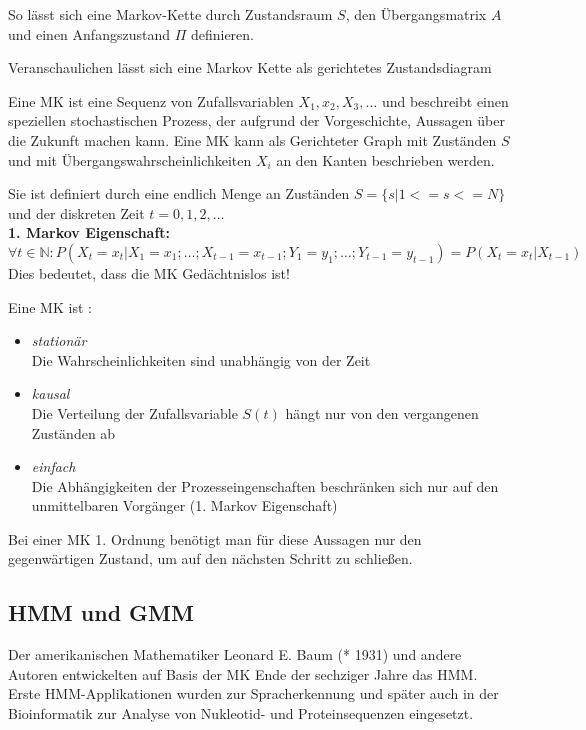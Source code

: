 So lässt sich eine Markov-Kette durch Zustandsraum \(S\), den Übergangsmatrix \( A \) und einen Anfangszustand \( \Pi \) definieren.
 
Veranschaulichen lässt sich eine Markov Kette als gerichtetes Zustandsdiagram




Eine \acl{MK} ist eine Sequenz von Zufallsvariablen \( X_1, x_2, X_3, \ldots\) und beschreibt einen speziellen stochastischen Prozess, 
der aufgrund der Vorgeschichte, Aussagen über die Zukunft machen kann. 
Eine \acl{MK} kann als Gerichteter Graph mit Zuständen \(S\) und mit Übergangswahrscheinlichkeiten \(X_i\) an den Kanten beschrieben werden. 

Sie ist definiert durch eine endlich Menge an Zuständen \( S = \{ s | 1 <= s <= N \} \) und der diskreten Zeit \( t = 0, 1, 2, \ldots \) \\

\textbf{1. Markov Eigenschaft: } \\
\( \forall t \in \mathbb{N} : P (X_t = x_t | X_1 = x_1 ; \ldots ; X_{t-1} = x_{t-1} ; Y_1 = y_1 ; \ldots ; Y_{t-1} = y_{t-1} ) = P (X_t = x_t | X_{t-1} ) \) \\
Dies bedeutet, dass die \acl{MK} Gedächtnislos ist!


Eine \acl{MK} ist \cite[48]{mmmFink}:
\begin{itemize}
     \item \textit{stationär} \\
           Die Wahrscheinlichkeiten sind unabhängig von der Zeit
     \item \textit{kausal} \\
           Die Verteilung der Zufallsvariable \( S(t)\) hängt nur von den vergangenen Zuständen ab
     \item \textit{einfach} \\
           Die Abhängigkeiten der Prozesseingenschaften beschränken sich nur auf den unmittelbaren Vorgänger (1. Markov Eigenschaft) 
\end{itemize}
Bei einer \acl{MK} 1. Ordnung benötigt man für diese Aussagen nur den gegenwärtigen Zustand, um auf den nächsten Schritt zu schließen.



\subsection{\acl{HMM} und \acl{GMM}}  \label{sec:hmm}
Der amerikanischen Mathematiker Leonard E. Baum (* 1931) und andere Autoren entwickelten auf Basis der \acl{MK} Ende der 
sechziger Jahre das \acl{HMM}. Erste \acl{HMM}-Applikationen wurden zur Spracherkennung und später auch in der Bioinformatik 
zur Analyse von Nukleotid- und Proteinsequenzen eingesetzt. 

